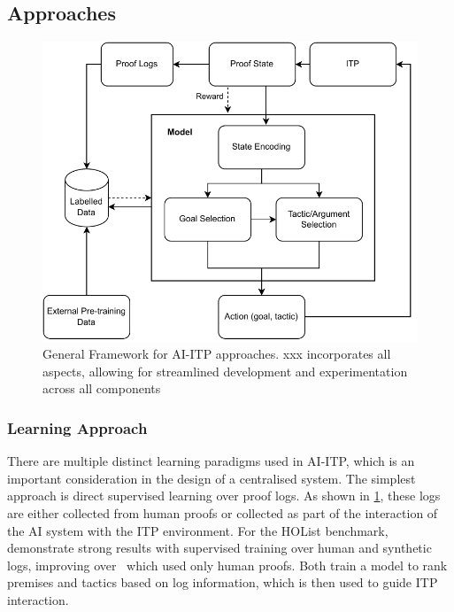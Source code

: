 \documentclass[letterpaper]{article} %
\begin{document}
    \subsection{Approaches}
    \begin{figure}[h]
        \centering
        \includegraphics[width=\linewidth]{AI-ITP}
        \caption{General Framework for AI-ITP approaches. xxx incorporates all aspects, allowing for streamlined development and experimentation across all components}
        \label{fig:ai-itp}
    \end{figure}

    \subsubsection{Learning Approach}
    There are multiple distinct learning paradigms used in AI-ITP, which is an important consideration in the design of a centralised system.
    The simplest approach is direct supervised learning over proof logs.
    As shown in \ref{fig:ai-itp},
    these logs are either collected from human proofs or collected as part of the interaction of the AI system with the ITP environment.
    For the HOList benchmark,~\cite{bansal_learning_2019} demonstrate strong results with supervised training over human and synthetic logs,
    improving over~\cite{paliwal_graph_2019} which used only human proofs.
    Both train a model to rank premises and tactics based on log information, which is then used to guide ITP interaction. \\
\end{document}
